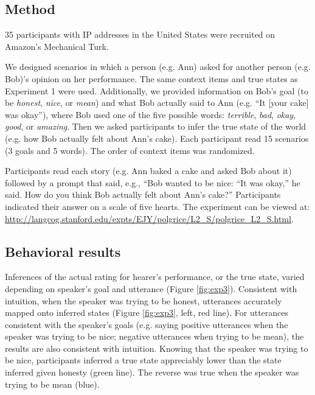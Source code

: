 \documentclass[10pt,letterpaper]{article}
\begin{document}
\subsection{Method}

35 participants with IP addresses in the United States were recruited on Amazon's Mechanical Turk.


We designed scenarios in which a person (e.g. Ann) asked for another person (e.g. Bob)'s opinion on her performance. The same context items and true states as Experiment 1 were used. Additionally, we provided information on Bob's goal (to be \emph{honest}, \emph{nice}, or \emph{mean}) and what Bob actually said to Ann (e.g. ``It [your cake] was okay''), where Bob used one of the five possible words: \emph{terrible}, \emph{bad}, \emph{okay}, \emph{good}, or \emph{amazing}. Then we asked participants to infer the true state of the world (e.g. how Bob actually felt about Ann's cake). Each participant read 15 scenarios (3 goals and 5 words). The order of context items was randomized.

Participants read each story (e.g. Ann baked a cake and asked Bob about it) followed by a prompt that said,
e.g., ``Bob wanted to be nice: ``It was okay,'' he said. How do you think Bob actually felt about Ann's cake?''
Participants indicated their answer on a scale of five hearts. 
The experiment can be viewed at: \url{http://langcog.stanford.edu/expts/EJY/polgrice/L2_S/polgrice_L2_S.html}.

\subsection{Behavioral results}

Inferences of the actual rating for hearer's performance, or the true state, varied depending on speaker's goal and utterance (Figure \ref{fig:exp3}).
Consistent with intuition, when the speaker was trying to be honest, utterances accurately mapped onto inferred states (Figure \ref{fig:exp3}, left, red line).
For utterances consistent with the speaker's goals (e.g. saying positive utterances when the speaker was trying to be nice; negative utterances when trying to be mean), the results are also consistent with intuition.
Knowing that the speaker was trying to be nice, participants inferred a true state appreciably lower than the state inferred given honesty (green line).
The reverse was true when the speaker was trying to be mean (blue).
\end{document}

